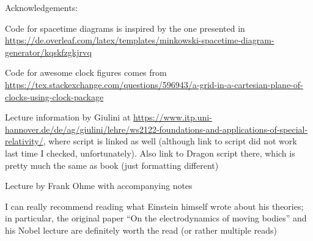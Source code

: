 



\makeindex





\pagestyle{plain.scrheadings}





\setcounter{page}{0}
\thispagestyle{empty}


\newpage


\begin{center}
Acknowledgements:

Code for spacetime diagrams is inspired by the one presented in \url{https://de.overleaf.com/latex/templates/minkowski-spacetime-diagram-generator/kqskfzgkjrvq}


Code for awesome clock figures comes from \url{https://tex.stackexchange.com/questions/596943/a-grid-in-a-cartesian-plane-of-clocks-using-clock-package}


Lecture information by Giulini at \url{https://www.itp.uni-hannover.de/de/ag/giulini/lehre/ws2122-foundations-and-applications-of-special-relativity/}, where script is linked as well (although link to script did not work last time I checked, unfortunately). Also link to Dragon script there, which is pretty much the same as book (just formatting different)

Lecture by Frank Ohme with accompanying notes


I can really recommend reading what Einstein himself wrote about his theories; in particular, the original paper \enquote{On the electrodynamics of moving bodies} and his Nobel lecture are definitely worth the read (or rather multiple reads)
\end{center}



\newpage



{
\hypersetup{linkcolor=black}
\tableofcontents
}

\newpage

{
\hypersetup{linkcolor=black}
\listoffigures
}

\newpage


\iffalse
{
\hypersetup{linkcolor=black}
\listoftables
}


